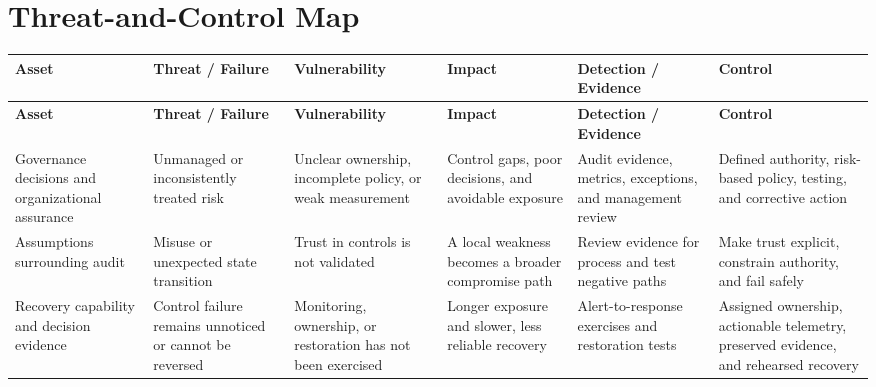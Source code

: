\documentclass[11pt]{article}
\begin{document}
\section*{Threat-and-Control Map}
\begingroup\scriptsize\setlength{\tabcolsep}{2pt}
\begin{longtable}{>{\RaggedRight\arraybackslash}p{}>{\RaggedRight\arraybackslash}p{}>{\RaggedRight\arraybackslash}p{}>{\RaggedRight\arraybackslash}p{}>{\RaggedRight\arraybackslash}p{}>{\RaggedRight\arraybackslash}p{}}
\toprule\rowcolor{Navy}\color{white}\textbf{Asset} & \color{white}\textbf{Threat / Failure} & \color{white}\textbf{Vulnerability} & \color{white}\textbf{Impact} & \color{white}\textbf{Detection / Evidence} & \color{white}\textbf{Control}\\\midrule
\endfirsthead
\toprule\rowcolor{Navy}\color{white}\textbf{Asset} & \color{white}\textbf{Threat / Failure} & \color{white}\textbf{Vulnerability} & \color{white}\textbf{Impact} & \color{white}\textbf{Detection / Evidence} & \color{white}\textbf{Control}\\\midrule
\endhead
Governance decisions and organizational assurance & Unmanaged or inconsistently treated risk & Unclear ownership, incomplete policy, or weak measurement & Control gaps, poor decisions, and avoidable exposure & Audit evidence, metrics, exceptions, and management review & Defined authority, risk-based policy, testing, and corrective action\\\midrule
Assumptions surrounding audit & Misuse or unexpected state transition & Trust in controls is not validated & A local weakness becomes a broader compromise path & Review evidence for process and test negative paths & Make trust explicit, constrain authority, and fail safely\\\midrule
Recovery capability and decision evidence & Control failure remains unnoticed or cannot be reversed & Monitoring, ownership, or restoration has not been exercised & Longer exposure and slower, less reliable recovery & Alert-to-response exercises and restoration tests & Assigned ownership, actionable telemetry, preserved evidence, and rehearsed recovery\\\midrule
\bottomrule
\end{longtable}
\endgroup
\end{document}
